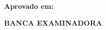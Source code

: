 \makeatletter
\begin{folhadeaprovacao}
\begin{center}
    {\ABNTEXchapterfont\bfseries\normalsize\imprimirautor}
    \vfill

    \ABNTEXchapterfont\bfseries\large\imprimirtitulo
\end{center}

\vfill

\abntex@ifnotempty{\imprimirpreambulo}{%
  \hspace{.35\textwidth}
  \begin{minipage}{.5\textwidth}
  \ABNTEXchapterfont\bfseries\normalsize\imprimirpreambulo
  \end{minipage}%
  \vfill
}%
\ABNTEXchapterfont\bfseries\normalsize{}Aprovado em:
\vfill
\begin{center}
    \ABNTEXchapterfont\bfseries\normalsize{}BANCA EXAMINADORA \\
    \vspace*{\fill}
    {\bfseries\normalsize\imprimirlocal}
    \par
    {\bfseries\normalsize\imprimirdata}
\end{center}
\end{folhadeaprovacao}
\makeatother
